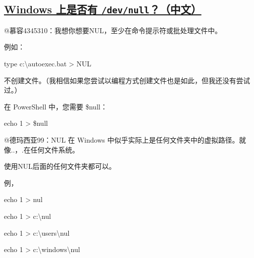 \subsection{\href{https://www.imooc.com/wenda/detail/578468}{Windows 上是否有 \lstinline{/dev/null}？（中文）}}

\begin{myquote}
@慕容4345310：我想你想要NUL，至少在命令提示符或批处理文件中。
\end{myquote}

\begin{myquote}
例如：
\end{myquote}

\begin{myquote}
type c:\textbackslash autoexec.bat > NUL
\end{myquote}

\begin{myquote}
不创建文件。（我相信如果您尝试以编程方式创建文件也是如此，但我还没有尝试过。）
\end{myquote}

\begin{myquote}
在 PowerShell 中，您需要 \$null：
\end{myquote}

\begin{myquote}
echo 1 > \$null
\end{myquote}

\begin{myquote}
@德玛西亚99：NUL 在 Windows 中似乎实际上是任何文件夹中的虚拟路径。就像..，.在任何文件系统。
\end{myquote}

\begin{myquote}
使用NUL后面的任何文件夹都可以。
\end{myquote}

\begin{myquote}
例，
\end{myquote}

\begin{myquote}
echo 1 > nul
\end{myquote}

\begin{myquote}
echo 1 > c:\textbackslash nul
\end{myquote}

\begin{myquote}
echo 1 > c:\textbackslash users\textbackslash nul
\end{myquote}

\begin{myquote}
echo 1 > c:\textbackslash windows\textbackslash nul
\end{myquote}

